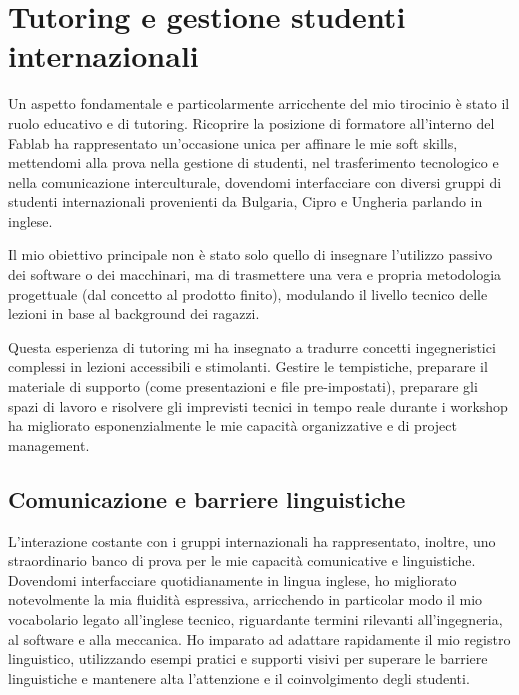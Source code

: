 \section{Tutoring e gestione studenti internazionali}
Un aspetto fondamentale e particolarmente arricchente del mio tirocinio è stato il ruolo educativo e di tutoring. Ricoprire la posizione di formatore all'interno del Fablab ha rappresentato un'occasione unica per affinare le mie soft skills, mettendomi alla prova nella gestione di studenti, nel trasferimento tecnologico e nella comunicazione interculturale, dovendomi interfacciare con diversi gruppi di studenti internazionali provenienti da Bulgaria, Cipro e Ungheria parlando in inglese.

Il mio obiettivo principale non è stato solo quello di insegnare l'utilizzo passivo dei software o dei macchinari, ma di trasmettere una vera e propria metodologia progettuale (dal concetto al prodotto finito), modulando il livello tecnico delle lezioni in base al background dei ragazzi.

Questa esperienza di tutoring mi ha insegnato a tradurre concetti ingegneristici complessi in lezioni accessibili e stimolanti. Gestire le tempistiche, preparare il materiale di supporto (come presentazioni e file pre-impostati), preparare gli spazi di lavoro e risolvere gli imprevisti tecnici in tempo reale durante i workshop ha migliorato esponenzialmente le mie capacità organizzative e di project management.

%
\subsection{Comunicazione e barriere linguistiche}
L'interazione costante con i gruppi internazionali ha rappresentato, inoltre, uno straordinario banco di prova per le mie capacità comunicative e linguistiche. Dovendomi interfacciare quotidianamente in lingua inglese, ho migliorato notevolmente la mia fluidità espressiva, arricchendo in particolar modo il mio vocabolario legato all'inglese tecnico, riguardante termini rilevanti all'ingegneria, al software e alla meccanica. Ho imparato ad adattare rapidamente il mio registro linguistico, utilizzando esempi pratici e supporti visivi per superare le barriere linguistiche e mantenere alta l'attenzione e il coinvolgimento degli studenti.

